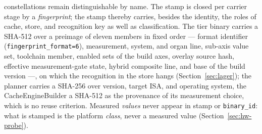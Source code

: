 \begin{nurkurz}
constellations remain distinguishable by name. The stamp is closed per carrier stage by a
\emph{fingerprint}; the stamp thereby carries, besides the identity, the roles of cache, store, and
recognition key as well as classification. The tier binary carries a SHA-512 over a preimage of eleven
members in fixed order --- format identifier (\texttt{fingerprint\_format=6}), measurement, system, and
organ line, sub-axis value set, toolchain member, enabled sets of the build axes, overlay source hash,
effective measurement-gate state, hybrid composite line, and base of the build version ---, on which
the recognition in the store hangs (Section~\ref{sec:lager}); the planner carries a SHA-256 over
version, target ISA, and operating system, the CacheEngineBuilder a SHA-512 as the provenance of its
measurement choice, which is no reuse criterion. Measured \emph{values} never appear in stamp or
\texttt{binary\_id}: what is stamped is the platform \emph{class}, never a measured value
(Section~\ref{sec:hw-probe}).

\end{nurkurz}

